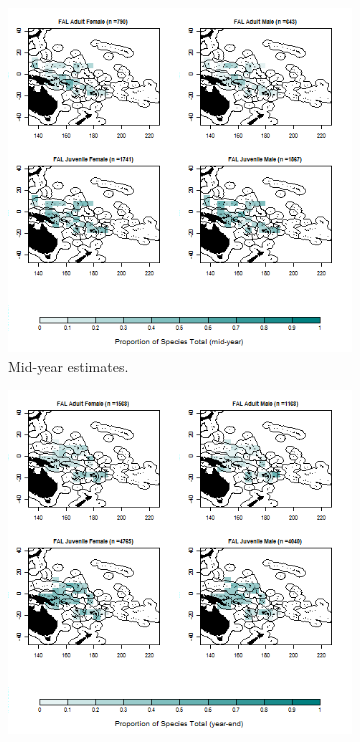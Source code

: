 \documentclass[12pt]{SCreport}
\begin{document}
\begin{landscape}
\begin{figure}
\centering
   \begin{subfigure}[b]{0.6\textwidth}
       \includegraphics[width=\textwidth]{../GRAPHICS/Defined/BI_22_Map_maturity_sex_FAL_MY}
       \caption{Mid-year estimates.}
       \label{fig:BI_22}
   \end{subfigure}
   \begin{subfigure}[b]{0.6\textwidth}
       \includegraphics[width=\textwidth]{../GRAPHICS/Defined/BI_21_Map_maturity_sex_FAL}

\end{subfigure}
\end{figure}
\end{landscape}
\end{document}
